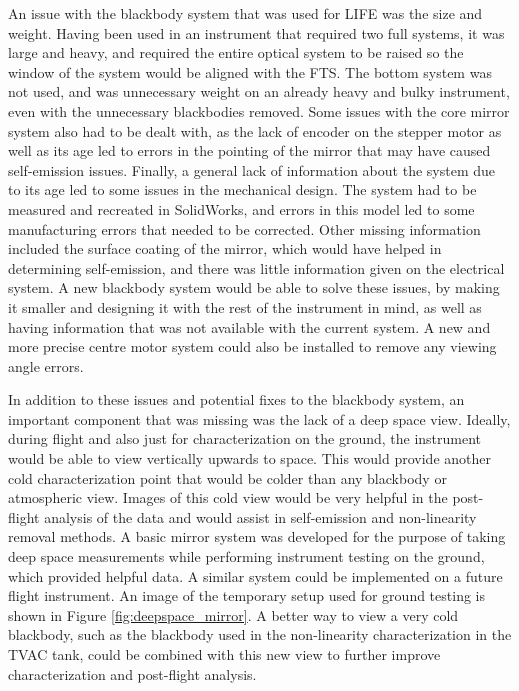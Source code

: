 An issue with the blackbody system that was used for LIFE was the size and weight. Having been used in an instrument that required two full systems, it was large and heavy, and required the entire optical system to be raised so the window of the system would be aligned with the FTS. The bottom system was not used, and was unnecessary weight on an already heavy and bulky instrument, even with the unnecessary blackbodies removed. Some issues with the core mirror system also had to be dealt with, as the lack of encoder on the stepper motor as well as its age led to errors in the pointing of the mirror that may have caused self-emission issues. Finally, a general lack of information about the system due to its age led to some issues in the mechanical design. The system had to be measured and recreated in SolidWorks, and errors in this model led to some manufacturing errors that needed to be corrected. Other missing information included the surface coating of the mirror, which would have helped in determining self-emission, and there was little information given on the electrical system. A new blackbody system would be able to solve these issues, by making it smaller and designing it with the rest of the instrument in mind, as well as having information that was not available with the current system. A new and more precise centre motor system could also be installed to remove any viewing angle errors.

In addition to these issues and potential fixes to the blackbody system, an important component that was missing was the lack of a deep space view. Ideally, during flight and also just for characterization on the ground, the instrument would be able to view vertically upwards to space. This would provide another cold characterization point that would be colder than any blackbody or atmospheric view. Images of this cold view would be very helpful in the post-flight analysis of the data and would assist in self-emission and non-linearity removal methods. A basic mirror system was developed for the purpose of taking deep space measurements while performing instrument testing on the ground, which provided helpful data. A similar system could be implemented on a future flight instrument. An image of the temporary setup used for ground testing is shown in Figure \ref{fig:deepspace_mirror}. A better way to view a very cold blackbody, such as the blackbody used in the non-linearity characterization in the TVAC tank, could be combined with this new view to further improve characterization and post-flight analysis.

